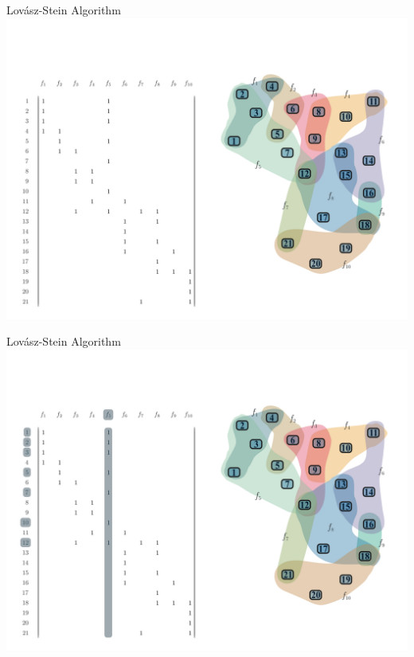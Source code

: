 \documentclass[10pt]{beamer}
\begin{document}
\begin{frame}[fragile]{Lovász-Stein Algorithm}
    \vspace*{-3em}\hspace*{-2em}\includegraphics[width=1.15\textwidth]{Images/LSAExample/01}
\end{frame}

\begin{frame}[fragile]{Lovász-Stein Algorithm}
    \vspace*{-3em}\hspace*{-2em}\includegraphics[width=1.15\textwidth]{Images/LSAExample/02}
\end{frame}
\end{document}
